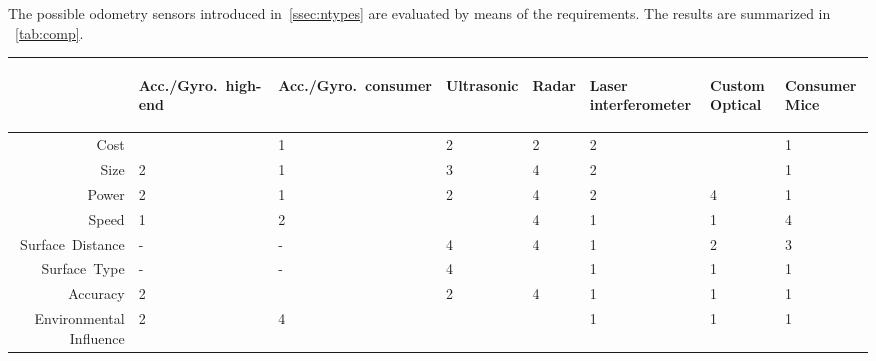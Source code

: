\documentclass[12pt,a4paper]{article}
\begin{document}
The possible odometry sensors introduced in~\autoref{ssec:ntypes} are evaluated by means of the requirements.
The results are summarized in ~\autoref{tab:comp}.

\begin{table}[htbp]
 \begin{threeparttable}[b]
  \centering
  \begin{tabular}{rlllllll}
      & \begin{turn}{60} Acc./Gyro.\ high-end  \end{turn} \hspace{-18mm} & \begin{turn}{60} Acc./Gyro.\ consumer  \end{turn} \hspace{-18mm} & \begin{turn}{60} Ultrasonic \end{turn} \hspace{-8mm} & \begin{turn}{60}  Radar  \end{turn}  \hspace{-5mm} & \begin{turn}{60}Laser interferometer \end{turn} \hspace{-18mm} & \begin{turn}{60}Custom Optical \end{turn} \hspace{-15mm} & \begin{turn}{60}Consumer Mice\end{turn} \hspace{-10mm}\\
     \hline
     Cost   & \color{red}{5}   & 1     & 2   &  2 & 2 & \color{red}{5}\tnote{4} & 1\\
     Size   & 2   & 1     & 3   &  4 & 2 & \color{red}{5} & 1\\
     Power   & 2   & 1     & 2   &  4 & 2 & 4 & 1 \\
     Speed   & 1   & 2     & \color{red}{5}\tnote{1}   &  4 & 1 & 1 & 4\\
     Surface\ Distance   & -   & -     & 4   &  4 & 1 & 2 & 3\\
     Surface\ Type   & -   & -     & 4   &  \color{red}{5}\tnote{3} & 1 & 1 & 1\\
     Accuracy  & 2   & \color{red}{5}     & 2   &  4 & 1 & 1 & 1\\
     Environmental Influence  & 2   & 4     & \color{red}{5}\tnote{2}   &  \color{red}{5} & 1 & 1 & 1\\

\end{tabular}
\end{threeparttable}
\end{table}
\end{document}
